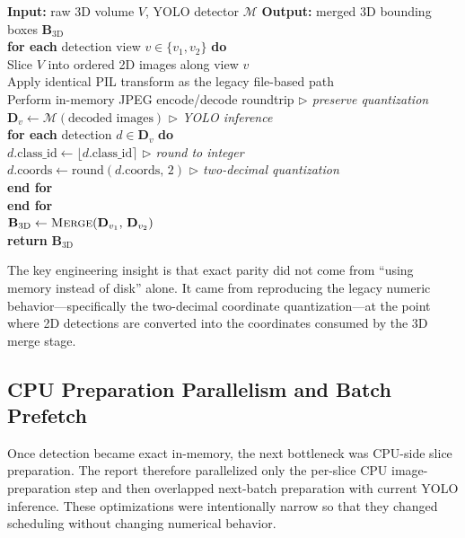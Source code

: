 \begin{pseudocode}
\textbf{Input:} raw 3D volume $V$, YOLO detector $\mathcal{M}$ \quad \textbf{Output:} merged 3D bounding boxes $\mathbf{B}_\text{3D}$ \\
\textbf{for each} detection view $v \in \{v_1, v_2\}$ \textbf{do} \\
\quad Slice $V$ into ordered 2D images along view $v$ \\
\quad Apply identical PIL transform as the legacy file-based path \\
\quad Perform in-memory JPEG encode/decode roundtrip \hfill\textit{$\triangleright$ preserve quantization} \\
\quad $\mathbf{D}_v \gets \mathcal{M}(\text{decoded images})$ \hfill\textit{$\triangleright$ YOLO inference} \\
\quad \textbf{for each} detection $d \in \mathbf{D}_v$ \textbf{do} \\
\quad\quad $d.\text{class\_id} \gets \lfloor d.\text{class\_id} \rceil$ \hfill\textit{$\triangleright$ round to integer} \\
\quad\quad $d.\text{coords} \gets \mathrm{round}(d.\text{coords},\, 2)$ \hfill\textit{$\triangleright$ two-decimal quantization} \\
\quad \textbf{end for} \\
\textbf{end for} \\
$\mathbf{B}_\text{3D} \gets \textsc{Merge}(\mathbf{D}_{v_1},\, \mathbf{D}_{v_2})$ \\
\textbf{return} $\mathbf{B}_\text{3D}$ \\
\end{pseudocode}

The key engineering insight is that exact parity did not come from
``using memory instead of disk'' alone. It came from reproducing the
legacy numeric behavior---specifically the two-decimal coordinate
quantization---at the point where 2D detections are converted into
the coordinates consumed by the 3D merge stage.

\hypertarget{cpu-preparation-parallelism-and-batch-prefetch}{%
\subsection{CPU Preparation Parallelism and Batch
Prefetch}\label{cpu-preparation-parallelism-and-batch-prefetch}}

Once detection became exact in-memory, the next bottleneck was CPU-side
slice preparation. The report therefore parallelized only the per-slice
CPU image-preparation step and then overlapped next-batch preparation
with current YOLO inference. These optimizations were intentionally
narrow so that they changed scheduling without changing numerical
behavior.

